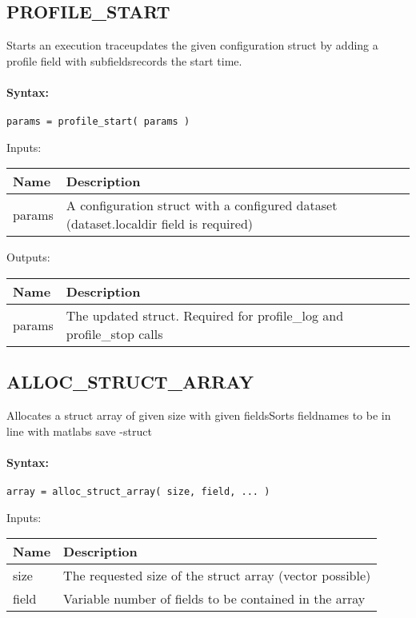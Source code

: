\subsection{PROFILE\_START}

Starts an execution traceupdates the given configuration struct by adding a profile field with subfieldsrecords the start time.

\paragraph{Syntax:} \verb|params = profile_start( params )|

\bigskip
Inputs:

\begin{tabular}{|p{}|p{}|}
\hline
\textbf{Name} & \textbf{Description} \\
\hline \hline
params & A configuration struct with a configured dataset (dataset.localdir field is required)  \\ \hline
\end{tabular}

\bigskip
Outputs:

\begin{tabular}{|p{}|p{}|}
\hline
\textbf{Name} & \textbf{Description} \\
\hline \hline
params & The updated struct. Required for profile\_log and profile\_stop calls  \\ \hline
\end{tabular}

\subsection{ALLOC\_STRUCT\_ARRAY}

Allocates a struct array of given size with given fieldsSorts fieldnames to be in line with matlabs save -struct

\paragraph{Syntax:} \verb|array = alloc_struct_array( size, field, ... )|

\bigskip
Inputs:

\begin{tabular}{|p{}|p{}|}
\hline
\textbf{Name} & \textbf{Description} \\
\hline \hline
size & The requested size of the struct array (vector possible)  \\ \hline
field & Variable number of fields to be contained in the array  \\ \hline
\end{tabular}

